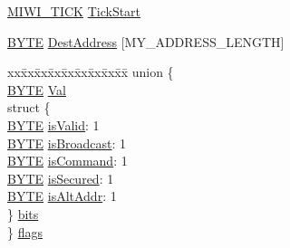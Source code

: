 \begin{DoxyCompactItemize}
\item 
\hyperlink{_symbol_time_8h_aa0f8e40665d4ca8eb3e8f91e9e85c323}{M\+I\+W\+I\+\_\+\+T\+I\+C\+K} \hyperlink{struct_i_n_d_i_r_e_c_t___m_e_s_s_a_g_e_ae503564adfdfd377ffa93790d164ca18}{Tick\+Start}
\item 
\hyperlink{_generic_type_defs_8h_a4ae1dab0fb4b072a66584546209e7d58}{B\+Y\+T\+E} \hyperlink{struct_i_n_d_i_r_e_c_t___m_e_s_s_a_g_e_a37d13c21b54bfcaeff8c5e1e5cc69bd1}{Dest\+Address} \mbox{[}M\+Y\+\_\+\+A\+D\+D\+R\+E\+S\+S\+\_\+\+L\+E\+N\+G\+T\+H\mbox{]}
\item 
\begin{tabbing}
xx\=xx\=xx\=xx\=xx\=xx\=xx\=xx\=xx\=\kill
union \{\\
\>\hyperlink{_generic_type_defs_8h_a4ae1dab0fb4b072a66584546209e7d58}{BYTE} \hyperlink{struct_i_n_d_i_r_e_c_t___m_e_s_s_a_g_e_a5ab8c2bf45b20b5f7aa3a4f083896cec}{Val}\\
\>struct \{\\
\>\>\hyperlink{_generic_type_defs_8h_a4ae1dab0fb4b072a66584546209e7d58}{BYTE} \hyperlink{struct_i_n_d_i_r_e_c_t___m_e_s_s_a_g_e_af1cac6e82b75a4d9e92ac637101c54e2}{isValid}: 1\\
\>\>\hyperlink{_generic_type_defs_8h_a4ae1dab0fb4b072a66584546209e7d58}{BYTE} \hyperlink{struct_i_n_d_i_r_e_c_t___m_e_s_s_a_g_e_a96538013b2f93acf8ef08671b38b63dd}{isBroadcast}: 1\\
\>\>\hyperlink{_generic_type_defs_8h_a4ae1dab0fb4b072a66584546209e7d58}{BYTE} \hyperlink{struct_i_n_d_i_r_e_c_t___m_e_s_s_a_g_e_aeaccc3aae04d11711ce7c8b1923788cf}{isCommand}: 1\\
\>\>\hyperlink{_generic_type_defs_8h_a4ae1dab0fb4b072a66584546209e7d58}{BYTE} \hyperlink{struct_i_n_d_i_r_e_c_t___m_e_s_s_a_g_e_aa2fc68f45fbebcd0e0aa5219878719e2}{isSecured}: 1\\
\>\>\hyperlink{_generic_type_defs_8h_a4ae1dab0fb4b072a66584546209e7d58}{BYTE} \hyperlink{struct_i_n_d_i_r_e_c_t___m_e_s_s_a_g_e_abec340a9c6fdb591175374a007838097}{isAltAddr}: 1\\
\>\} \hyperlink{struct_i_n_d_i_r_e_c_t___m_e_s_s_a_g_e_a6912fea850e806d0ec013a05c40ea1ce}{bits}\\
\} \hyperlink{struct_i_n_d_i_r_e_c_t___m_e_s_s_a_g_e_abdc3b5d2061cbd7476dcddb0c03047eb}{flags}\\


\end{tabbing}
\end{DoxyCompactItemize}
